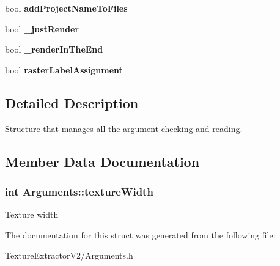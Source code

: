 \begin{DoxyCompactItemize}
\item 
\hypertarget{struct_arguments_a5438dd5f419d88e72ba7dad3e7343229}{}bool {\bfseries add\+Project\+Name\+To\+Files}\label{struct_arguments_a5438dd5f419d88e72ba7dad3e7343229}

\item 
\hypertarget{struct_arguments_a425be50cc8828826b939677321ae98dc}{}bool {\bfseries \+\_\+just\+Render}\label{struct_arguments_a425be50cc8828826b939677321ae98dc}

\item 
\hypertarget{struct_arguments_ada75eb1bead23d95007b7a757050015e}{}bool {\bfseries \+\_\+render\+In\+The\+End}\label{struct_arguments_ada75eb1bead23d95007b7a757050015e}

\item 
\hypertarget{struct_arguments_ae808c944e2083f6a3f6763e13bf2b268}{}bool {\bfseries raster\+Label\+Assignment}\label{struct_arguments_ae808c944e2083f6a3f6763e13bf2b268}

\end{DoxyCompactItemize}


\subsection{Detailed Description}
Structure that manages all the argument checking and reading. 

\subsection{Member Data Documentation}
\hypertarget{struct_arguments_a53b1eb430f4ea67ffd9a85696a295cd0}{}
\subsubsection[{texture\+Width}]{\setlength{\rightskip}{0pt plus 5cm}int Arguments\+::texture\+Width}\label{struct_arguments_a53b1eb430f4ea67ffd9a85696a295cd0}
Texture width 

The documentation for this struct was generated from the following file\+:\begin{DoxyCompactItemize}
\item 
Texture\+Extractor\+V2/Arguments.\+h\end{DoxyCompactItemize}
